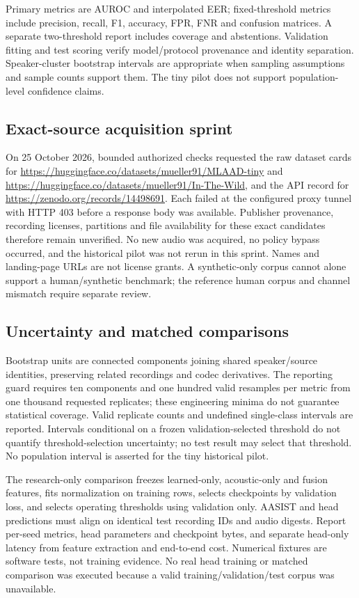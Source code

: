 \IfFileExists{IEEEtran.cls}{\documentclass[conference]{IEEEtran}}{\documentclass[10pt,twocolumn]{article}\usepackage[margin=0.75in]{geometry}}
\begin{document}
Primary metrics are AUROC and interpolated EER; fixed-threshold metrics include precision, recall, F1, accuracy, FPR, FNR and confusion matrices. A separate two-threshold report includes coverage and abstentions. Validation fitting and test scoring verify model/protocol provenance and identity separation. Speaker-cluster bootstrap intervals are appropriate when sampling assumptions and sample counts support them. The tiny pilot does not support population-level confidence claims.

\subsection{Exact-source acquisition sprint}
On 25 October 2026, bounded authorized checks requested the raw dataset cards for \url{https://huggingface.co/datasets/mueller91/MLAAD-tiny} and \url{https://huggingface.co/datasets/mueller91/In-The-Wild}, and the API record for \url{https://zenodo.org/records/14498691}. Each failed at the configured proxy tunnel with HTTP 403 before a response body was available. Publisher provenance, recording licenses, partitions and file availability for these exact candidates therefore remain unverified. No new audio was acquired, no policy bypass occurred, and the historical pilot was not rerun in this sprint. Names and landing-page URLs are not license grants. A synthetic-only corpus cannot alone support a human/synthetic benchmark; the reference human corpus and channel mismatch require separate review.

\subsection{Uncertainty and matched comparisons}
Bootstrap units are connected components joining shared speaker/source identities, preserving related recordings and codec derivatives. The reporting guard requires ten components and one hundred valid resamples per metric from one thousand requested replicates; these engineering minima do not guarantee statistical coverage. Valid replicate counts and undefined single-class intervals are reported. Intervals conditional on a frozen validation-selected threshold do not quantify threshold-selection uncertainty; no test result may select that threshold. No population interval is asserted for the tiny historical pilot.

The research-only comparison freezes learned-only, acoustic-only and fusion features, fits normalization on training rows, selects checkpoints by validation loss, and selects operating thresholds using validation only. AASIST and head predictions must align on identical test recording IDs and audio digests. Report per-seed metrics, head parameters and checkpoint bytes, and separate head-only latency from feature extraction and end-to-end cost. Numerical fixtures are software tests, not training evidence. No real head training or matched comparison was executed because a valid training/validation/test corpus was unavailable.
\end{document}
